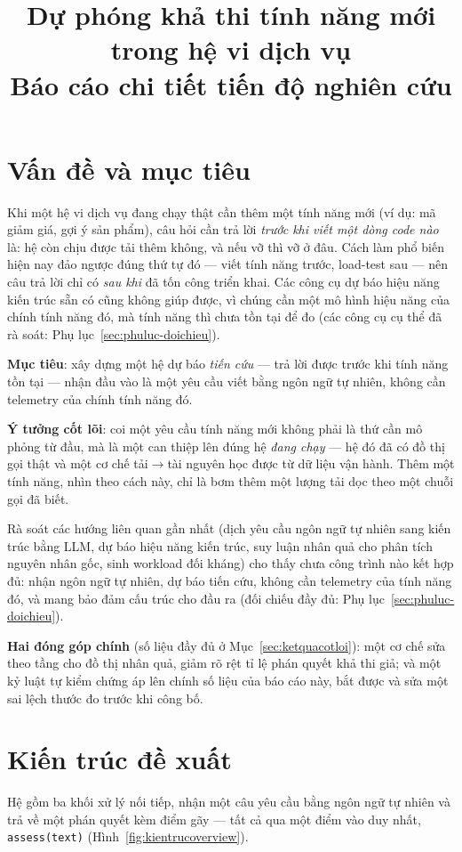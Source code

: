 \documentclass[11pt,a4paper]{article}
\title{\textbf{Dự phóng khả thi tính năng mới\\ trong hệ vi dịch vụ}\\[0.4em]
       \large Báo cáo chi tiết tiến độ nghiên cứu}
\begin{document}
\maketitle

\tableofcontents
\newpage

\section{Vấn đề và mục tiêu}\label{sec:vandemuctieu}
Khi một hệ vi dịch vụ đang chạy thật cần thêm một tính năng mới (ví dụ: mã giảm
giá, gợi ý sản phẩm), câu hỏi cần trả lời \emph{trước khi viết một dòng code nào}
là: hệ còn chịu được tải thêm không, và nếu vỡ thì vỡ ở đâu. Cách làm phổ biến
hiện nay đảo ngược đúng thứ tự đó --- viết tính năng trước, load-test sau --- nên
câu trả lời chỉ có \emph{sau khi} đã tốn công triển khai. Các công cụ dự báo hiệu
năng kiến trúc sẵn có cũng không giúp được, vì chúng cần một mô hình hiệu năng
của chính tính năng đó, mà tính năng thì chưa tồn tại để đo (các công cụ cụ thể
đã rà soát: Phụ lục~\ref{sec:phuluc-doichieu}).

\textbf{Mục tiêu}: xây dựng một hệ dự báo \emph{tiến cứu} --- trả lời được trước
khi tính năng tồn tại --- nhận đầu vào là một yêu cầu viết bằng ngôn ngữ tự nhiên,
không cần telemetry của chính tính năng đó.

\textbf{Ý tưởng cốt lõi}: coi một yêu cầu tính năng mới không phải là thứ cần mô
phỏng từ đầu, mà là một can thiệp lên đúng hệ \emph{đang chạy} --- hệ đó đã có đồ
thị gọi thật và một cơ chế tải$\to$tài nguyên học được từ dữ liệu vận hành. Thêm
một tính năng, nhìn theo cách này, chỉ là bơm thêm một lượng tải dọc theo một
chuỗi gọi đã biết.

Rà soát các hướng liên quan gần nhất (dịch yêu cầu ngôn ngữ tự nhiên sang kiến
trúc bằng LLM, dự báo hiệu năng kiến trúc, suy luận nhân quả cho phân tích nguyên
nhân gốc, sinh workload đối kháng) cho thấy chưa công trình nào kết hợp đủ: nhận
ngôn ngữ tự nhiên, dự báo tiến cứu, không cần telemetry của tính năng đó, và mang
bảo đảm cấu trúc cho đầu ra (đối chiếu đầy đủ: Phụ lục~\ref{sec:phuluc-doichieu}).

\textbf{Hai đóng góp chính} (số liệu đầy đủ ở Mục~\ref{sec:ketquacotloi}): một cơ
chế sửa theo tầng cho đồ thị nhân quả, giảm rõ rệt tỉ lệ phán quyết khả thi giả;
và một kỷ luật tự kiểm chứng áp lên chính số liệu của báo cáo này, bắt được và
sửa một sai lệch thước đo trước khi công bố.

\section{Kiến trúc đề xuất}\label{sec:kientruc}
Hệ gồm ba khối xử lý nối tiếp, nhận một câu yêu cầu bằng ngôn ngữ tự nhiên và trả
về một phán quyết kèm điểm gãy --- tất cả qua một điểm vào duy nhất,
\texttt{assess(text)} (Hình~\ref{fig:kientrucoverview}).
\end{document}
